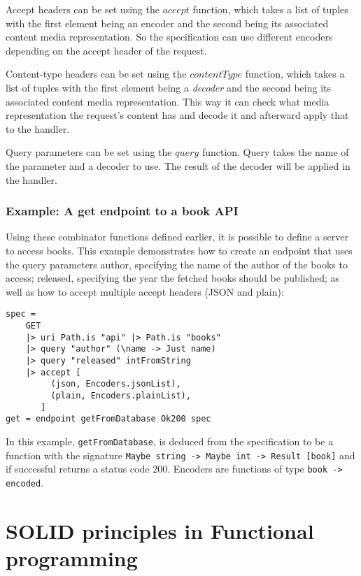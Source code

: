 Accept headers can be set using the $accept$ function, which takes a list of
tuples with the first element being an encoder and the second being its
associated content media representation. So the specification can use different
encoders depending on the accept header of the request.

Content-type headers can be set using the $contentType$ function, which takes a
list of tuples with the first element being a \textit{decoder} and the second
being its associated content media representation. This way it can check what
media representation the request's content has and decode it and afterward apply
that to the handler. 

Query parameters can be set using the $query$ function. Query takes the name of
the parameter and a decoder to use. The result of the decoder will be applied in
the handler.

\subsubsection{Example: A get endpoint to a book API}

Using these combinator functions defined earlier, it is possible to define a
server to access books. This example demonstrates how to create an endpoint that
uses the query parameters author, specifying the name of the author of the
books to access; released, specifying the year the fetched books should be
published; as well as how to accept multiple accept headers (JSON and plain):


\begin{lstlisting}
spec = 
    GET
    |> uri Path.is "api" |> Path.is "books"
    |> query "author" (\name -> Just name)
    |> query "released" intFromString
    |> accept [
         (json, Encoders.jsonList),
         (plain, Encoders.plainList),
       ]
get = endpoint getFromDatabase Ok200 spec
\end{lstlisting}

In this example, \texttt{getFromDatabase}, is deduced from the specification to
be a function with the signature \texttt{Maybe string -> Maybe int -> Result
[book]} and if successful returns a status code 200. Encoders are functions of
type \texttt{book -> encoded}. 

\section{SOLID principles in Functional programming}\label{dependencyinjection}


